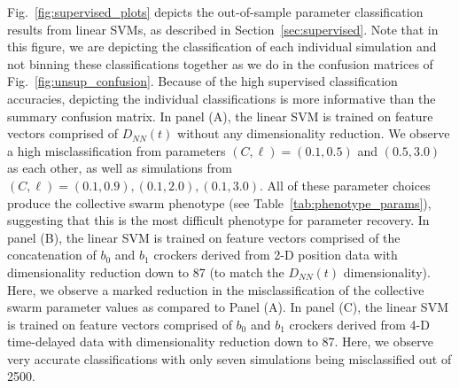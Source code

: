 \documentclass[%
 aip,
reprint,
 amsmath,amssymb,
 aps,
showkeys
]{revtex4-1}
\begin{document}
Fig.~\ref{fig:supervised_plots} depicts the
out-of-sample parameter classification results from linear SVMs, as described in Section~\ref{sec:supervised}. Note that in this figure, we are depicting the classification of each individual simulation and not binning these classifications together as we do in the confusion matrices of Fig.~\ref{fig:unsup_confusion}. Because of the high supervised classification accuracies, depicting the individual classifications is more informative than the summary confusion matrix.  In panel (A), the linear SVM is trained on feature vectors comprised of $D_{NN}(t)$ without any dimensionality reduction. We observe a high misclassification from parameters $(C,\ell)=(0.1,0.5)$ and $(0.5,3.0)$ as each other, as well as simulations from $(C,\ell)=(0.1,0.9),(0.1,2.0),(0.1,3.0)$. All of these parameter choices produce the collective swarm phenotype (see Table~\ref{tab:phenotype_params}), suggesting that this is the most difficult phenotype for parameter recovery. In panel (B), the linear SVM is trained on feature vectors comprised of the concatenation of $b_0$ and $b_1$ crockers derived from 2-D position data with dimensionality reduction down to 87 (to match the $D_{NN}(t)$ dimensionality). Here, we observe a marked reduction in the misclassification of the collective swarm parameter values as compared to Panel (A). In panel (C), the linear SVM is trained on feature vectors comprised of $b_0$ and $b_1$ crockers derived from 4-D time-delayed data with dimensionality reduction down to 87. Here, we observe very accurate classifications with only seven simulations being misclassified out of 2500.





%

\nocite{*}
%

\end{document}
